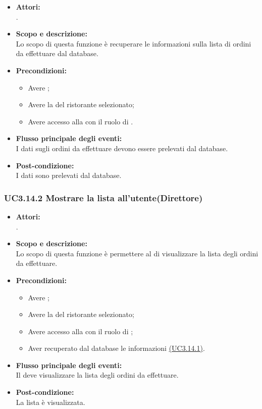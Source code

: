 \begin{itemize}
	\item \textbf{Attori:}
	\\.
	\item \textbf{Scopo e descrizione:} 
	\\Lo scopo di questa funzione è recuperare le informazioni sulla lista di ordini da effettuare dal database.
	\item \textbf{Precondizioni:}
	\begin{itemize}
		\item Avere ;
		\item Avere la  del ristorante selezionato;
		\item Avere accesso alla  con il ruolo di .
	\end{itemize}
	\item \textbf{Flusso principale degli eventi:}
	\\I dati sugli ordini da effettuare devono essere prelevati dal database.
	\item \textbf{Post-condizione:}
	\\I dati sono prelevati dal database.
\end{itemize}

\subsubsection{UC3.14.2 Mostrare la lista all'utente(Direttore)} \label{UC3.14.2}

\begin{itemize}
	\item \textbf{Attori:}
	\\.
	\item \textbf{Scopo e descrizione:} 
	\\Lo scopo di questa funzione è permettere al  di visualizzare la lista degli ordini da effettuare.
	\item \textbf{Precondizioni:}
	\begin{itemize}
		\item Avere ;
		\item Avere la  del ristorante selezionato;
		\item Avere accesso alla  con il ruolo di ;
		\item Aver recuperato dal database le informazioni \hyperref[UC3.14.1]{(UC3.14.1)}.
	\end{itemize}
	\item \textbf{Flusso principale degli eventi:}
	\\Il {} deve visualizzare la lista degli ordini da effettuare.
	\item \textbf{Post-condizione:}
	\\La lista è visualizzata.
\end{itemize}

